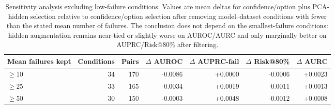 
\begin{table}[t]
\centering
\small
\caption{Sensitivity analysis excluding low-failure conditions. Values are mean deltas for confidence/option plus PCA-hidden selection relative to confidence/option selection after removing model--dataset conditions with fewer than the stated mean number of failures. The conclusion does not depend on the smallest-failure conditions: hidden augmentation remains near-tied or slightly worse on AUROC/AURC and only marginally better on AUPRC/Risk@80\% after filtering.}
\label{tab:low-failure-sensitivity}
\begin{tabular}{lrrrrrr}
\toprule
Mean failures kept & Conditions & Pairs & $\Delta$ AUROC & $\Delta$ AUPRC-fail & $\Delta$ Risk@80\% & $\Delta$ AURC \\
\midrule
$\geq$10 & 34 & 170 & -0.0086 & +0.0000 & -0.0006 & +0.0023 \\
$\geq$25 & 33 & 165 & -0.0034 & +0.0019 & -0.0011 & +0.0013 \\
$\geq$50 & 30 & 150 & -0.0003 & +0.0048 & -0.0012 & +0.0008 \\
\bottomrule
\end{tabular}
\end{table}
